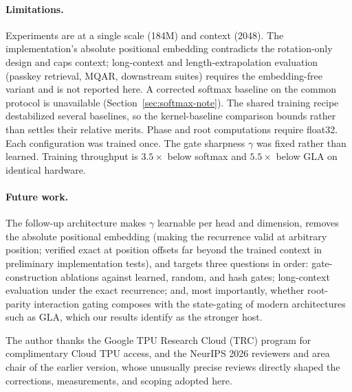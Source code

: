\documentclass{article}
\begin{document}
\paragraph{Limitations.} Experiments are at a single scale (184M) and context (2048). The implementation's absolute positional embedding contradicts the rotation-only design and caps context; long-context and length-extrapolation evaluation (passkey retrieval, MQAR, downstream suites) requires the embedding-free variant and is not reported here. A corrected softmax baseline on the common protocol is unavailable (Section~\ref{sec:softmax-note}). The shared training recipe destabilized several baselines, so the kernel-baseline comparison bounds rather than settles their relative merits. Phase and root computations require float32. Each configuration was trained once. The gate sharpness $\gamma$ was fixed rather than learned. Training throughput is $3.5\times$ below softmax and $5.5\times$ below GLA on identical hardware.

\paragraph{Future work.} The follow-up architecture makes $\gamma$ learnable per head and dimension, removes the absolute positional embedding (making the recurrence valid at arbitrary position; verified exact at position offsets far beyond the trained context in preliminary implementation tests), and targets three questions in order: gate-construction ablations against learned, random, and hash gates; long-context evaluation under the exact recurrence; and, most importantly, whether root-parity interaction gating composes with the state-gating of modern architectures such as GLA, which our results identify as the stronger host.

\begin{ack}
The author thanks the Google TPU Research Cloud (TRC) program for complimentary Cloud TPU access, and the NeurIPS 2026 reviewers and area chair of the earlier version, whose unusually precise reviews directly shaped the corrections, measurements, and scoping adopted here.
\end{ack}
\end{document}
